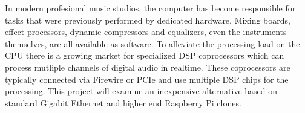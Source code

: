 In modern profesional music studios, the computer has become responsible for tasks that were previously performed by dedicated hardware. Mixing boards, effect processors, dynamic compressors and equalizers, even the instruments themselves, are all available as software. To alleviate the processing load on the CPU there is a growing market for specialized DSP coprocessors which can process mutliple channels of digital audio in realtime. These coprocessors are typically connected via Firewire or PCIe and use multiple DSP chips for the processing. This project will examine an inexpensive alternative based on standard Gigabit Ethernet and higher end Raspberry Pi clones.

